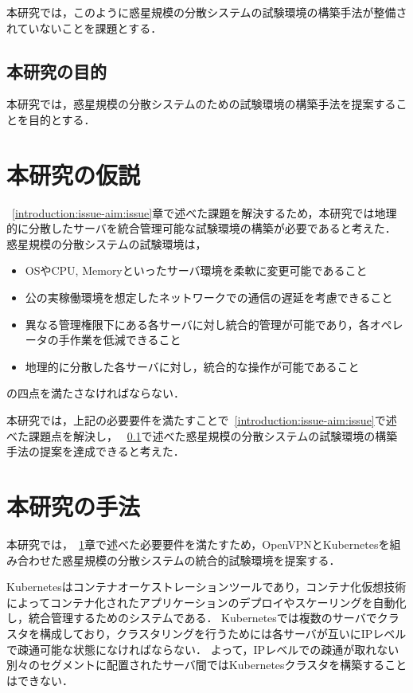 本研究では，このように惑星規模の分散システムの試験環境の構築手法が整備されていないことを課題とする．

\subsection{本研究の目的}
\label{introduction:issue-aim:aim}

本研究では，惑星規模の分散システムのための試験環境の構築手法を提案することを目的とする．

\section{本研究の仮説}
\label{introduction:hypothesis}

~\ref{introduction:issue-aim:issue}章で述べた課題を解決するため，本研究では地理的に分散したサーバを統合管理可能な試験環境の構築が必要であると考えた．
惑星規模の分散システムの試験環境は，
\begin{itemize}
  \item OSやCPU, Memoryといったサーバ環境を柔軟に変更可能であること
  \item 公の実稼働環境を想定したネットワークでの通信の遅延を考慮できること
  \item 異なる管理権限下にある各サーバに対し統合的管理が可能であり，各オペレータの手作業を低減できること
  \item 地理的に分散した各サーバに対し，統合的な操作が可能であること
\end{itemize}
の四点を満たさなければならない．

本研究では，上記の必要要件を満たすことで~\ref{introduction:issue-aim:issue}で述べた課題点を解決し，
~\ref{introduction:issue-aim:aim}で述べた惑星規模の分散システムの試験環境の構築手法の提案を達成できると考えた．

\section{本研究の手法}
\label{introduction:proposal}

本研究では，~\ref{introduction:hypothesis}章で述べた必要要件を満たすため，OpenVPNとKubernetesを組み合わせた惑星規模の分散システムの統合的試験環境を提案する．

Kubernetesはコンテナオーケストレーションツールであり，コンテナ化仮想技術によってコンテナ化されたアプリケーションのデプロイやスケーリングを自動化し，統合管理するためのシステムである．
Kubernetesでは複数のサーバでクラスタを構成しており，クラスタリングを行うためには各サーバが互いにIPレベルで疎通可能な状態になければならない．
よって，IPレベルでの疎通が取れない別々のセグメントに配置されたサーバ間ではKubernetesクラスタを構築することはできない．

